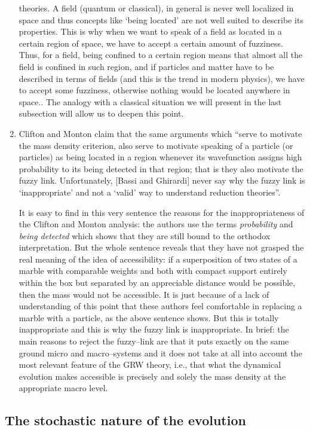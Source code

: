 \documentclass[10pt,a4paper]{article}
\begin{document}
\begin{enumerate}
{theories. A field (quantum or classical), in general is never well
localized in space and thus concepts like `being located' are not
well suited to describe its properties. This is why when we want
to speak of a field as located in a certain region of space, we
have to accept a certain amount of fuzziness. Thus, for a field,
being confined to a certain region  means that almost all the
field is confined in such region, and if particles and matter have
to be described in terms of fields (and this is the trend in
modern physics), we have to accept some fuzziness, otherwise
nothing would be located anywhere in space.}. The analogy with a
classical situation we will present in the last subsection  will
allow us to deepen this point.

\item Clifton and Monton claim that the same arguments which
``serve to motivate the mass density criterion, also serve to
motivate speaking of a particle (or particles) as being located in
a region whenever its wavefunction assigns high probability to its
being detected in that region; that is they also motivate the
fuzzy link. Unfortunately, [Bassi and Ghirardi] never say why the
fuzzy link is `inappropriate' and not a `valid' way to understand
reduction theories''.

It is easy to find in this very sentence the reasons for the
inappropriateness of the Clifton and Monton analysis: the authors
use the terms {\it probability} and {\it being detected} which
shows that they are still bound to the orthodox interpretation.
But the whole sentence reveals that they have not grasped the real
meaning of the idea of accessibility: if a superposition of two
states of a marble with comparable weights and both with compact
support entirely within the box but separated by an appreciable
distance would be possible, then the mass would not be accessible.
It is just because of a lack of understanding of this point that
these authors feel comfortable in replacing a marble with a
particle, as  the above sentence shows. But this is totally
inappropriate and this is why the fuzzy link is inappropriate. In
brief: the main reasons to reject the fuzzy--link are that it puts
exactly on the same ground micro and macro--systems and it does
not take at all into account the most relevant feature of the GRW
theory, i.e., that what the dynamical evolution makes accessible
is precisely and solely the mass density at the appropriate macro level.
\end{enumerate}


\subsection{The stochastic nature of the evolution} \label{sec136}
\end{document}
